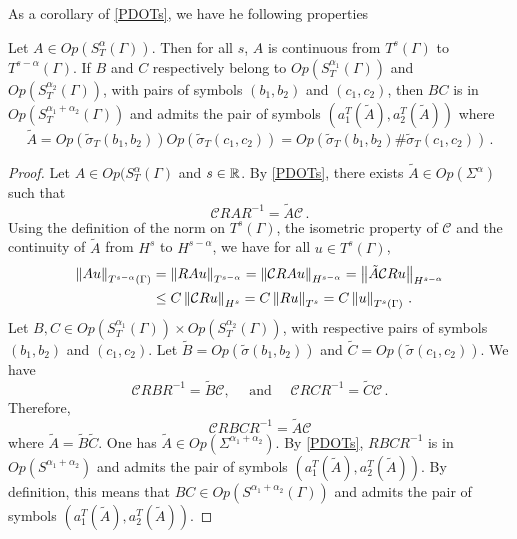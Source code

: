 \documentclass[a4paper]{article}
\begin{document}
\noindent As a corollary of \autoref{PDOTs}, we have he following properties
\begin{Cor}
	\label{CorContinuitePDOTs}
	Let $A \in \textit{Op}(S^\alpha_T(\Gamma))$. Then for all $s$, $A$ is continuous from $T^s(\Gamma)$ to $T^{s - \alpha}(\Gamma)$. If $B$ and $C$ respectively belong to $\textit{Op}(S^{\alpha_1}_T(\Gamma))$ and $\textit{Op}(S^{\alpha_2}_T(\Gamma))$, with pairs of symbols $(b_1,b_2)$ and $(c_1,c_2)$, then $BC$ is in $\textit{Op}(S^{\alpha_1 + \alpha_2}_T(\Gamma))$ and admits the pair of symbols $\left(a_1^T(\tilde{A}),a_2^T(\tilde{A})\right)$ where
	\[\tilde{A} = \textit{Op}(\tilde{\sigma}_T(b_1,b_2)) \textit{Op}(\tilde{\sigma}_T(c_1,c_2)) = \textit{Op}(\tilde{\sigma}_T(b_1,b_2)\#\tilde{\sigma}_T(c_1,c_2))\,.\]
\end{Cor}
\begin{proof}
	Let $A \in \textit{Op}(S^\alpha_T(\Gamma)$ and $s \in \mathbb{R}$. By \autoref{PDOTs}, there exists $\tilde{A} \in \textit{Op}(\Sigma^\alpha)$ such that 
	\[\mathcal{C}RAR^{-1} = \tilde{A}\mathcal{C}\,.\]
	Using the definition of the norm on $T^s(\Gamma)$, the isometric property of $\mathcal{C}$ and the continuity of $\tilde{A}$ from $H^s$ to $H^{s - \alpha}$, we have for all $u \in T^s(\Gamma)$,  
	\[\begin{split}
	\left\|Au\right\|_{T^{s-\alpha}(\Gamma)} &= \left\|RA u\right\|_{T^{s-\alpha}}
	=\left\|\mathcal{C}RA u\right\|_{H^{s-\alpha}}
	=\left\|\tilde{A}\mathcal{C}Ru\right\|_{H^{s-\alpha}}\\
	&\leq C \left\|\mathcal{C}Ru\right\|_{H^s} = C\left\|Ru\right\|_{T^s} = C\left\|u\right\|_{T^s(\Gamma)}\,.
	\end{split}\]
	Let $B,C \in \textit{Op}(S^{\alpha_1}_T(\Gamma))\times\textit{Op}(S^{\alpha_2}_T(\Gamma))$, with respective pairs of symbols $(b_1,b_2)$ and $(c_1,c_2)$. Let $\tilde{B} = \textit{Op}(\tilde{\sigma}{(b_1,b_2)})$ and $\tilde{C} = \textit{Op}(\tilde{\sigma}{(c_1,c_2)})$. We have 
	\[\mathcal{C} RBR^{-1} = \tilde{B} \mathcal{C}, \quad \text{ and } \quad  \mathcal{C} RCR^{-1} = \tilde{C} \mathcal{C}\,.\]
	Therefore, 
	\[\mathcal{C} RBCR^{-1} = \tilde{A} \mathcal{C}\]
	where $\tilde{A} = \tilde{B}\tilde{C}$. One has $\tilde{A} \in \textit{Op}(\Sigma^{\alpha_1 + \alpha_2})$. By \autoref{PDOTs}, $RBCR^{-1}$ is in $\textit{Op}(S^{\alpha_1 + \alpha_2})$ and admits the pair of symbols $(a_1^T(\tilde{A}),a_2^T(\tilde{A}))$. By definition, this means that $BC \in \textit{Op}(S^{\alpha_1 + \alpha_2}(\Gamma))$ and admits the pair of symbols $(a_1^T(\tilde{A}),a_2^T(\tilde{A}))$. 
\end{proof}
\end{document}
